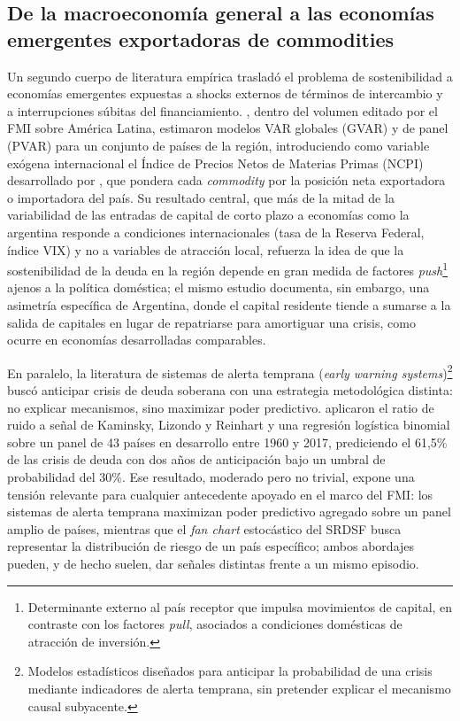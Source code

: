 \subsection{De la macroeconomía general a las economías emergentes exportadoras de commodities}
Un segundo cuerpo de literatura empírica trasladó el problema de sostenibilidad a economías emergentes expuestas a shocks externos de términos de intercambio y a interrupciones súbitas del financiamiento. \citet{adler2014}, dentro del volumen editado por el FMI sobre América Latina, estimaron modelos VAR globales (GVAR) y de panel (PVAR) para un conjunto de países de la región, introduciendo como variable exógena internacional el Índice de Precios Netos de Materias Primas (NCPI) desarrollado por \citet{adlermagud2014}, que pondera cada \textit{commodity} por la posición neta exportadora o importadora del país. Su resultado central, que más de la mitad de la variabilidad de las entradas de capital de corto plazo a economías como la argentina responde a condiciones internacionales (tasa de la Reserva Federal, índice VIX) y no a variables de atracción local, refuerza la idea de que la sostenibilidad de la deuda en la región depende en gran medida de factores \textit{push}\footnote{Determinante externo al país receptor que impulsa movimientos de capital, en contraste con los factores \textit{pull}, asociados a condiciones domésticas de atracción de inversión.} ajenos a la política doméstica; el mismo estudio documenta, sin embargo, una asimetría específica de Argentina, donde el capital residente tiende a sumarse a la salida de capitales en lugar de repatriarse para amortiguar una crisis, como ocurre en economías desarrolladas comparables.

En paralelo, la literatura de sistemas de alerta temprana (\textit{early warning systems})\footnote{Modelos estadísticos diseñados para anticipar la probabilidad de una crisis mediante indicadores de alerta temprana, sin pretender explicar el mecanismo causal subyacente.} buscó anticipar crisis de deuda soberana con una estrategia metodológica distinta: no explicar mecanismos, sino maximizar poder predictivo. \citet{wijayanti2020} aplicaron el ratio de ruido a señal de Kaminsky, Lizondo y Reinhart y una regresión logística binomial sobre un panel de 43 países en desarrollo entre 1960 y 2017, prediciendo el 61,5\% de las crisis de deuda con dos años de anticipación bajo un umbral de probabilidad del 30\%. Ese resultado, moderado pero no trivial, expone una tensión relevante para cualquier antecedente apoyado en el marco del FMI: los sistemas de alerta temprana maximizan poder predictivo agregado sobre un panel amplio de países, mientras que el \textit{fan chart} estocástico del SRDSF busca representar la distribución de riesgo de un país específico; ambos abordajes pueden, y de hecho suelen, dar señales distintas frente a un mismo episodio.

